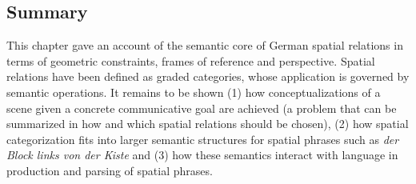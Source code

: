 \subsection{Summary}
This chapter gave an account of the semantic core 
of German spatial relations in terms of geometric constraints,
frames of reference and perspective. Spatial relations have been
defined as graded categories, whose application is governed
by semantic operations. It remains to be shown (1) how 
conceptualizations of a scene given a concrete communicative
goal are achieved (a problem that can be summarized in how and 
which spatial relations should be chosen),  (2) how spatial
categorization fits into larger semantic structures for spatial
phrases such as \textit{der Block links von der Kiste} and (3)
how these semantics interact with language in production 
and parsing of spatial phrases.